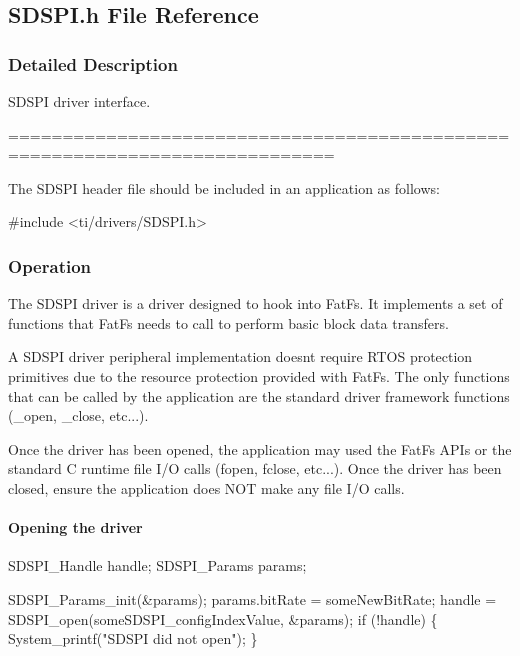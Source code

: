 \subsection{S\+D\+S\+P\+I.\+h File Reference}
\label{_s_d_s_p_i_8h}


\subsubsection{Detailed Description}
S\+D\+S\+P\+I driver interface. 

============================================================================

The S\+D\+S\+P\+I header file should be included in an application as follows\+: 
\begin{DoxyCode}
\textcolor{preprocessor}{#include <ti/drivers/SDSPI.h>}
\end{DoxyCode}


\subsubsection*{Operation}

The S\+D\+S\+P\+I driver is a driver designed to hook into Fat\+Fs. It implements a set of functions that Fat\+Fs needs to call to perform basic block data transfers.

A S\+D\+S\+P\+I driver peripheral implementation doesn\textquotesingle{}t require R\+T\+O\+S protection primitives due to the resource protection provided with Fat\+Fs. The only functions that can be called by the application are the standard driver framework functions (\+\_\+open, \+\_\+close, etc...).

Once the driver has been opened, the application may used the Fat\+Fs A\+P\+Is or the standard C runtime file I/\+O calls (fopen, fclose, etc...). Once the driver has been closed, ensure the application does N\+O\+T make any file I/\+O calls.

\paragraph*{Opening the driver}


\begin{DoxyCode}
SDSPI_Handle      handle;
SDSPI_Params      params;

SDSPI_Params_init(&params);
params.bitRate  = someNewBitRate;
handle = SDSPI_open(someSDSPI\_configIndexValue, &params);
\textcolor{keywordflow}{if} (!handle) \{
    System\_printf(\textcolor{stringliteral}{"SDSPI did not open"});
\}
\end{DoxyCode}


